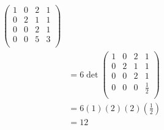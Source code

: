 \documentclass{eh-homework}
\begin{document}
\begin{question}{1}
\begin{align*}
\begin{pmatrix}
                1 & 0 & 2 &  1 \\
                0 & 2 & 1 &  1 \\
                0 & 0 & 2 &  1 \\
                0 & 0 & 5 &  3 \\
            \end{pmatrix} \\
            &= 6\det \begin{pmatrix}
                1 & 0 & 2 &  1 \\
                0 & 2 & 1 &  1 \\
                0 & 0 & 2 &  1 \\
                0 & 0 & 0 &  \frac{1}{2} \\
            \end{pmatrix} \\
            &= 6(1)(2)(2)\left(\frac{1}{2}\right) \\
            &= 12
    \end{align*}
    \end{question}
    
\end{document}
